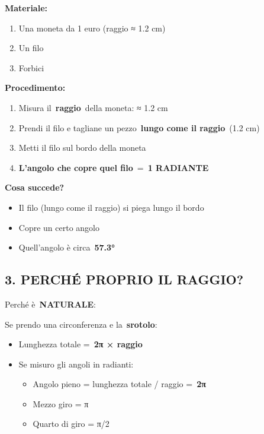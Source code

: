 \documentclass[
]{article}
\providecommand{\tightlist}{%
  \setlength{\itemsep}{0pt}\setlength{\parskip}{0pt}}
\begin{document}
\textbf{Materiale:}

\begin{enumerate}
\def\labelenumi{\arabic{enumi}.}
\tightlist
\item
  Una moneta da 1 euro (raggio ≈ 1.2 cm)
\item
  Un filo
\item
  Forbici
\end{enumerate}

\textbf{Procedimento:}

\begin{enumerate}
\def\labelenumi{\arabic{enumi}.}
\tightlist
\item
  Misura il~\textbf{raggio}~della moneta: ≈ 1.2 cm
\item
  Prendi il filo e tagliane un pezzo~\textbf{lungo come il raggio}~(1.2 cm)
\item
  Metti il filo sul bordo della moneta
\item
  \textbf{L'angolo che copre quel filo}~=~\textbf{1 RADIANTE}
\end{enumerate}

\textbf{Cosa succede?}

\begin{itemize}
\tightlist
\item
  Il filo (lungo come il raggio) si piega lungo il bordo
\item
  Copre un certo angolo
\item
  Quell'angolo è circa~\textbf{57.3°}
\end{itemize}

\hypertarget{perchuxe9-proprio-il-raggio}{%
\subsection{\texorpdfstring{\textbf{3. PERCHÉ PROPRIO IL RAGGIO?}}{3. PERCHÉ PROPRIO IL RAGGIO?}}\label{perchuxe9-proprio-il-raggio}}

Perché è~\textbf{NATURALE}:

Se prendo una circonferenza e la~\textbf{srotolo}:

\begin{itemize}
\tightlist
\item
  Lunghezza totale =~\textbf{2π × raggio}
\item
  Se misuro gli angoli in radianti:

  \begin{itemize}
  \tightlist
  \item
    Angolo pieno = lunghezza totale / raggio =~\textbf{2π}
  \item
    Mezzo giro = π
  \item
    Quarto di giro = π/2
  \end{itemize}
\end{itemize}
\end{document}
